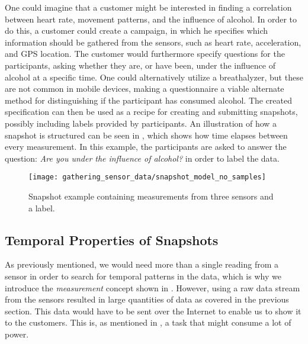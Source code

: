 One could imagine that a customer might be interested in finding a correlation between heart rate, movement patterns, and the influence of alcohol. In order to do this, a customer could create a campaign, in which he specifies which information should be gathered from the sensors, such as heart rate, acceleration, and GPS location. The customer would furthermore specify questions for the participants, asking whether they are, or have been, under the influence of alcohol at a specific time. One could alternatively utilize a breathalyzer, but these are not common in mobile devices, making a questionnaire a viable alternate method for distinguishing if the participant has consumed alcohol. The created specification can then be used as a recipe for creating and submitting snapshots, possibly including labels provided by participants. An illustration of how a snapshot is structured can be seen in , which shows how time elapses between every measurement. In this example, the participants are asked to answer the question: \emph{Are you under the influence of alcohol?} in order to label the data.
\\
\begin{figure}[!htbp]
    \centering
    \texttt{[image: gathering\_sensor\_data/snapshot\_model\_no\_samples]}
    \caption{Snapshot example containing measurements from three sensors and a label.}
    \label{fig:snapshot_model_no_samples}
\end{figure}
\FloatBarrier



\subsection{Temporal Properties of Snapshots}
\label{sec:temporal_properties_of_snapshots}


As previously mentioned, we would need more than a single reading from a sensor in order to search for temporal patterns in the data, which is why we introduce the \emph{measurement} concept shown in . However, using a raw data stream from the sensors resulted in large quantities of data as covered in the previous section. This data would have to be sent over the Internet to enable us to show it to the customers. This is, as mentioned in , a task that might consume a lot of power. 

